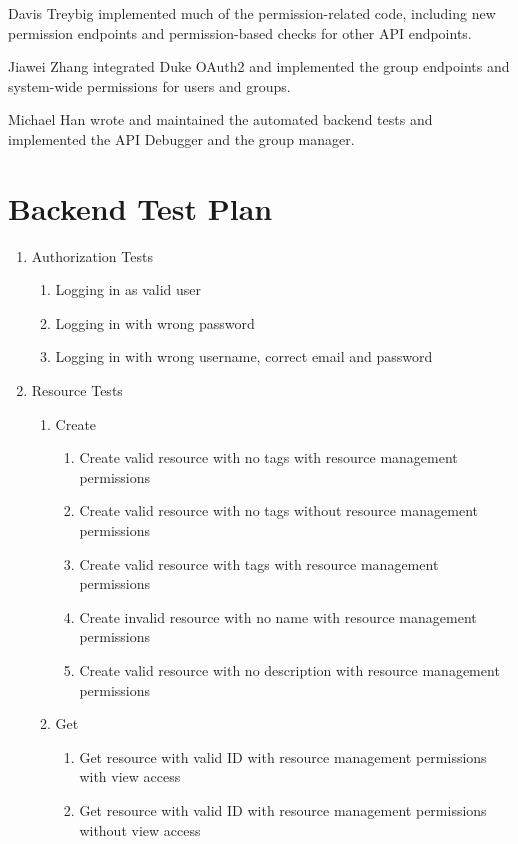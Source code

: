 \documentclass[12pt]{article}
\begin{document}
Davis Treybig implemented much of the permission-related code, including new permission endpoints and permission-based checks for other API endpoints. 

Jiawei Zhang integrated Duke OAuth2 and implemented the group endpoints and system-wide permissions for users and groups.

Michael Han wrote and maintained the automated backend tests and implemented the API Debugger and the group manager.

\clearpage
\appendix
\section{Backend Test Plan}
\label{appendix:backendtest}
\begin{enumerate}
    \item Authorization Tests
    \begin{enumerate}
        \item Logging in as valid user
        \item Logging in with wrong password
        \item Logging in with wrong username, correct email and password
    \end{enumerate}
    \item Resource Tests
    \begin{enumerate}
        \item Create
        \begin{enumerate}
            \item Create valid resource with no tags with resource management permissions
            \item Create valid resource with no tags without resource management permissions
            \item Create valid resource with tags with resource management permissions
            \item Create invalid resource with no name with resource management permissions
            \item Create valid resource with no description with resource management permissions
        \end{enumerate}
        \item Get
        \begin{enumerate}
            \item Get resource with valid ID with resource management permissions with view access
            \item Get resource with valid ID with resource management permissions without view access

\end{enumerate}
\end{enumerate}
\end{enumerate}
\end{document}
